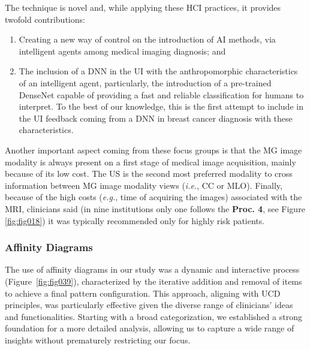 
\noindent
The technique is novel and, while applying these \ac{HCI} practices, it provides twofold contributions:

\vspace{0.50mm}

\begin{enumerate}
\item Creating a new way of control on the introduction of \ac{AI} methods, via intelligent agents among medical imaging diagnosis; and
\item The inclusion of a \ac{DNN} in the \ac{UI} with the anthropomorphic characteristics of an intelligent agent, particularly, the introduction of a pre-trained DenseNet capable of providing a fast and reliable classification for humans to interpret.
To the best of our knowledge, this is the first attempt to include in the \ac{UI} feedback coming from a \ac{DNN} in breast cancer diagnosis with these characteristics.
\end{enumerate}

\vspace{0.50mm}

Another important aspect coming from these focus groups is that the \ac{MG} image modality is always present on a first stage of medical image acquisition, mainly because of its low cost.
The \ac{US} is the second most preferred modality to cross information between \ac{MG} image modality views ({\it i.e.}, \ac{CC} or \ac{MLO}).
Finally, because of the high costs ({\it e.g.}, time of acquiring the images) associated with the \ac{MRI}, clinicians said (in nine institutions only one follows the {\bf Proc. 4}, see Figure \ref{fig:fig018}) it was typically recommended only for highly risk patients.

\subsubsection{Affinity Diagrams}
\label{sec:chap005003003003}

\textcolor{revised}{The use of affinity diagrams in our study was a dynamic and interactive process (Figure~\ref{fig:fig039}), characterized by the iterative addition and removal of items to achieve a final pattern configuration.
This approach, aligning with \ac{UCD} principles, was particularly effective given the diverse range of clinicians' ideas and functionalities.
Starting with a broad categorization, we established a strong foundation for a more detailed analysis, allowing us to capture a wide range of insights without prematurely restricting our focus.}

